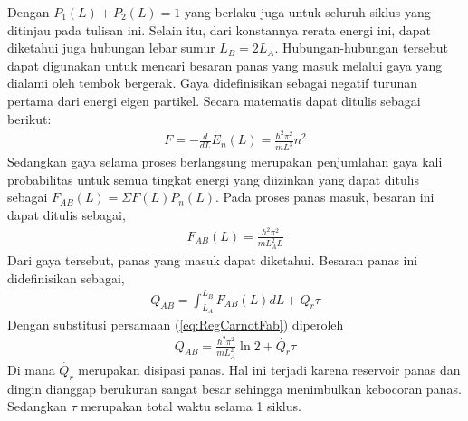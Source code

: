 Dengan \(P_1(L) + P_2(L) = 1\) yang berlaku juga untuk seluruh siklus yang ditinjau pada tulisan ini. Selain itu, dari konstannya rerata energi ini, dapat diketahui juga hubungan lebar sumur \(L_B = 2L_A\). Hubungan-hubungan tersebut dapat digunakan untuk mencari besaran panas yang masuk melalui gaya yang dialami oleh tembok bergerak. Gaya didefinisikan sebagai negatif turunan pertama dari energi eigen partikel. Secara matematis dapat ditulis sebagai berikut:
\begin{align}
    F = -\frac{d}{dL}E_n(L) = \frac{\hbar^2\pi^2}{mL^3}n^2 \label{eq:RegCarnotF}
\end{align}
Sedangkan gaya selama proses berlangsung merupakan penjumlahan gaya kali probabilitas untuk semua tingkat energi yang diizinkan yang dapat ditulis sebagai \(F_{AB}(L) = \Sigma F(L)P_n(L)\). Pada proses panas masuk, besaran ini dapat ditulis sebagai,
\begin{align}
    F_{AB}(L) = \frac{\hbar^2\pi^2}{mL_A^2L} \label{eq:RegCarnotFab}
\end{align}
Dari gaya tersebut, panas yang masuk dapat diketahui. Besaran panas ini didefinisikan sebagai,
\begin{align}
    Q_{AB} = \int_{L_A}^{L_B}F_{AB}(L)dL + \dot{Q_r}\tau
\end{align}
Dengan substitusi persamaan (\ref{eq:RegCarnotFab}) diperoleh
\begin{align}
    Q_{AB} = \frac{\hbar^2\pi^2}{mL_A^2}\ln{2} + \dot{Q_r}\tau \label{eq:RegCarnotQab}
\end{align}
Di mana \(\dot{Q_r}\) merupakan disipasi panas. Hal ini terjadi karena reservoir panas dan dingin dianggap berukuran sangat besar sehingga menimbulkan kebocoran panas. Sedangkan \(\tau\) merupakan total waktu selama 1 siklus. \cite{Wu2006Brayton}
